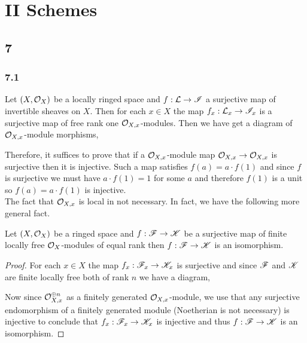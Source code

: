 \documentclass[12pt]{article}
\begin{document}
\tableofcontents

\newpage

\section{II Schemes}


\subsection{7}

\subsubsection{7.1}

Let $(X, \mathcal{O}_{X})$ be a locally ringed space and $f : \mathcal{L} \to \mathscr{I}$ a surjective map of invertible sheaves on $X$. Then for each $x \in X$ the map $f_x : \mathcal{L}_x \to \mathscr{I}_x$ is a surjective map of free rank one $\mathcal{O}_{X, x}$-modules. Then we have get a diagram of $\mathcal{O}_{X, x}$-module morphisms,
\begin{center}
\end{center}
Therefore, it suffices to prove that if a $\mathcal{O}_{X, x}$-module map $\mathcal{O}_{X, x} \to \mathcal{O}_{X, x}$ is surjective then it is injective. Such a map satisfies $f(a) = a \cdot f(1)$ and since $f$ is surjective we must have $a \cdot f(1) = 1$ for some $a$ and therefore $f(1)$ is a unit so $f(a) = a \cdot f(1)$ is injective.
\bigskip\\
The fact that $\mathcal{O}_{X, x}$ is local in not necessary. In fact, we have the following more general fact.

\begin{theorem}
Let $(X, \mathcal{O}_{X})$ be a ringed space and $f : \mathscr{F} \to \mathscr{K}$ be a surjective map of finite locally free $\mathcal{O}_{X}$-modules of equal rank then $f : \mathscr{F} \to \mathscr{K}$ is an isomorphism. 
\end{theorem}

\begin{proof}
For each $x \in X$ the map $f_x : \mathscr{F}_x \to \mathscr{K}_x$ is surjective and since $\mathscr{F}$ and $\mathscr{K}$ are finite locally free both of rank $n$ we have a diagram,
\begin{center}
\end{center}
Now since $\mathcal{O}_{X, x}^{\oplus n}$ as a finitely generated $\mathcal{O}_{X, x}$-module,  we use that any surjective endomorphism of a finitely generated module (Noetherian is not necessary) is injective to conclude that $f_x : \mathscr{F}_x \to \mathscr{K}_x$ is injective and thus $f : \mathscr{F} \to \mathscr{K}$ is an isomorphism. 
\end{proof}
\end{document}
